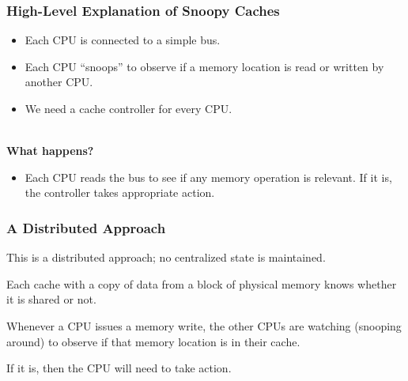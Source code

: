 \begin{frame}
  \frametitle{High-Level Explanation of Snoopy Caches}

  
  \begin{itemize}
    \item Each CPU is connected to a simple bus.
    \item Each CPU ``snoops'' to observe if a memory location is read or written
      by another CPU.
    \item We need a cache controller for every CPU.
  \end{itemize}
  ~\\
  {\bf What happens?}

  \begin{itemize}
    \item Each CPU reads the bus to see if any memory operation is relevant. If
      it is, the controller takes appropriate action.
  \end{itemize}
  
\end{frame}



\begin{frame}
\frametitle{A Distributed Approach}


This is a distributed approach; no centralized state is maintained. 

Each cache with a copy of data from a block of physical memory knows whether it is shared or not. 

Whenever a CPU issues a memory write, the other CPUs are watching (snooping around) to observe if that memory location is in their cache. 

If it is, then the CPU will need to take action.

\end{frame}


